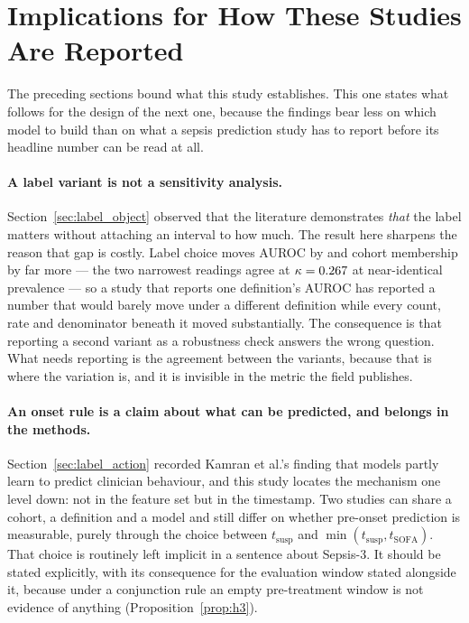 \section{Implications for How These Studies Are Reported}
\label{sec:implications}

The preceding sections bound what this study establishes. This one states what
follows for the design of the next one, because the findings bear less on which
model to build than on what a sepsis prediction study has to report before its
headline number can be read at all.

\paragraph{A label variant is not a sensitivity analysis.}
Section~\ref{sec:label_object} observed that the literature demonstrates
\emph{that} the label matters without attaching an interval to how much. The
result here sharpens the reason that gap is costly. Label choice moves AUROC by
\pcSpreadLabel{} and cohort membership by far more --- the two narrowest
readings agree at $\kappa = 0.267$ at near-identical prevalence --- so a
study that reports one definition's AUROC has reported a number that would
barely move under a different definition while every count, rate and
denominator beneath it moved substantially. The consequence is that reporting a
second variant as a robustness check answers the wrong question. What needs
reporting is the agreement between the variants, because that is where the
variation is, and it is invisible in the metric the field publishes.

\paragraph{An onset rule is a claim about what can be predicted, and belongs in
the methods.}
Section~\ref{sec:label_action} recorded Kamran et al.'s finding that models
partly learn to predict clinician behaviour, and this study locates the
mechanism one level down: not in the feature set but in the timestamp. Two
studies can share a cohort, a definition and a model and still differ on
whether pre-onset prediction is measurable, purely through the choice between
$t_{\text{susp}}$ and $\min(t_{\text{susp}}, t_{\text{SOFA}})$. That choice is
routinely left implicit in a sentence about Sepsis-3. It should be stated
explicitly, with its consequence for the evaluation window stated alongside it,
because under a conjunction rule an empty pre-treatment window is not evidence
of anything (Proposition~\ref{prop:h3}).

